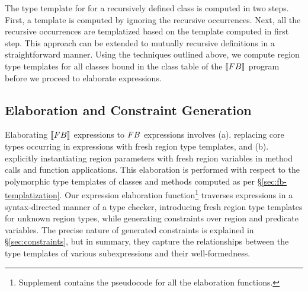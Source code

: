 The type template for for a recursively defined class is computed in
two steps. First, a template is computed by ignoring the recursive
occurrences. Next, all the recursive occurrences are templatized based
on the template computed in first step.  This approach can be extended
to mutually recursive definitions in a straightforward manner. Using
the techniques outlined above, we compute region type templates for
all classes bound in the class table of the $\llbracket {\sc FB} \rrbracket$ program
before we proceed to elaborate expressions.

%
%

\subsection{Elaboration and Constraint Generation}

Elaborating $\llbracket {\sc FB} \rrbracket$ expressions to ${\sc FB}$ expressions involves
(a). replacing core types occurring in expressions with fresh region
type templates, and (b). explicitly instantiating region parameters
with fresh region variables in method calls and function applications.
This elaboration is performed with respect to the polymorphic type
templates of classes and methods computed as per
\S\ref{sec:fb-templatization}. Our expression elaboration
function\footnote{Supplement contains the pseudocode for all the
elaboration functions.} traverses expressions in a syntax-directed
manner of a type checker, introducing fresh region type templates for
unknown region types, while generating constraints over region and
predicate variables. The precise nature of generated constraints is
explained in \S\ref{sec:constraints}, but in summary, they
capture the relationships between the type templates of various
subexpressions and their well-formedness.

